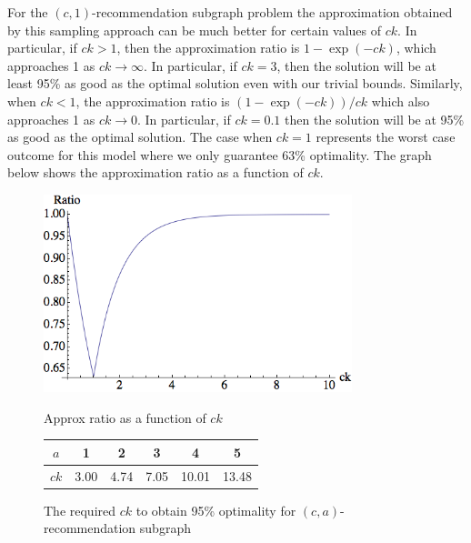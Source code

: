 For the $(c, 1)$-recommendation subgraph problem the approximation obtained by this sampling
approach can be much better for certain values of $ck$. In particular,
if $ck>1$, then the approximation ratio is $1-\exp(-ck)$, which
approaches 1 as $ck\to\infty$. In particular, if $ck=3$, then the
solution will be at least 95\% as good as the optimal solution even
with our trivial bounds. Similarly, when $ck<1$, the approximation
ratio is $(1-\exp(-ck))/ck$ which also approaches 1 as $ck\to 0$. In
particular, if $ck=0.1$ then the solution will be at 95\% as good as
the optimal solution. The case when $ck=1$ represents the
worst case outcome for this model where we only guarantee 63\%
optimality. The graph below shows the approximation ratio as a
function of $ck$.\vs

\begin{figure}[b]
\centering
\begin{minipage}[h]{0.45\textwidth}
  \centering
  \includegraphics[width=0.8\textwidth]{images/sri_Original.png}
  \caption{Approx ratio as a function of $ck$ }\label{fig:simple_approx}
\end{minipage}
\hspace{0cm}
\begin{minipage}[t]{0.45\textwidth}
  \centering
  \begin{tabular}{ |c|c|c|c|c|c| }
    \hline
    $a$ & 1 & 2 & 3 & 4 & 5 \\ \hline
    $ck$ & 3.00 & 4.74 & 7.05 & 10.01 & 13.48 \\
    \hline
  \end{tabular}
  \vspace{0.7cm}
  \caption{The required $ck$ to obtain 95\% optimality for $(c, a)$-recommendation subgraph}
\end{minipage}
\end{figure} 



